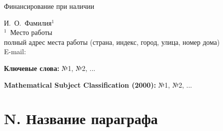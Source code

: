 

\Russian

 \def\endpage{??}




 \let\thefootnote\relax\setcounter{section}{0}\setcounter{equation}{0}


 \UDC{ } %
 \DOI{ } %





 \begin{center}
 Финансирование при наличии
 \end{center}


 \begin{center}
 {И.~О.~Фамилия$^{1}$\\[4pt]}
 {\rm\footnotesize{$^1$\,
 Место работы\\
 полный адрес места работы (страна, индекс, город, улица, номер дома)\\
 E-mail: }}
 \end{center}


 \Abstract{ } %

 {\noindent\footnotesize{\bf Ключевые слова:} №1, №2, ... \par} %

 \smallskip

 {\noindent\footnotesize {\bf Mathematical Subject Classification (2000):}  №1, №2, ...\par} %




 \section{N. Название параграфа}


 \Endproc


 \beginproof
 \endproof


 \Endproc


 \Sledstvie{}
 \Endproc

 \Zam{}

